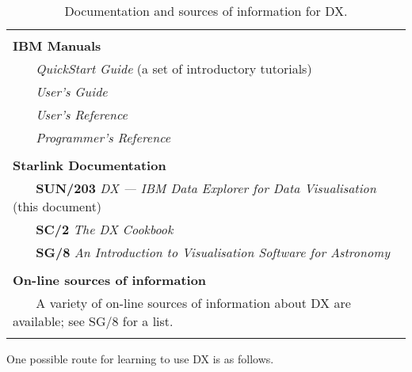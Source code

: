 \begin{table}[htbp]

\begin{center}
\begin{tabular}{|l|} \hline
   \\
{\large\bf IBM Manuals}  \\
~~~ {\it QuickStart Guide}\cite{QUICKS} (a set of introductory tutorials) \\
~~~ {\it User's Guide}\cite{USERG} \\
~~~ {\it User's Reference}\cite{USERR} \\
~~~ {\it Programmer's Reference}\cite{PROGR} \\
   \\
{\large\bf Starlink Documentation} \\
~~~ {\bf SUN/203} {\it DX --- IBM Data Explorer for Data Visualisation}\,
(this document)  \\
~~~ {\bf SC/2} {\it The DX Cookbook}\cite{SC2}  \\
~~~ {\bf SG/8} {\it An Introduction to Visualisation Software for
     Astronomy}\cite{SG8}  \\
   \\
{\large\bf On-line sources of information} \\
~~~ A variety of on-line sources of information about DX are available; 
 see SG/8 for a list. \\ 
   \\ \hline
\end{tabular}

\caption[Documentation and sources of information for DX.]
{Documentation and sources of information for DX. \label{DOCS} }
\end{center}

\vspace{5mm}

\end{table}

One possible route for learning to use DX is as follows.

